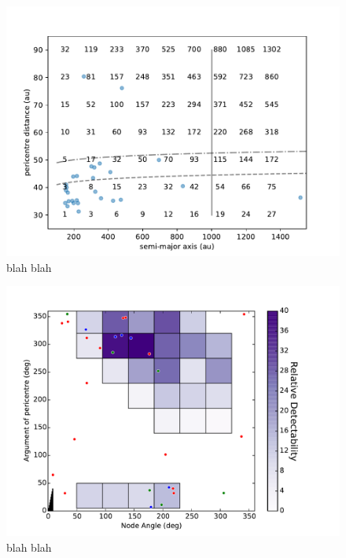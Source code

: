 \documentclass{aastex62}
\begin{document}
\begin{figure}
\begin{center}
\includegraphics[scale=0.8]{figures/figure1.pdf}
\caption{
blah blah
}
\label{fig1}
\end{center}
\end{figure}

\begin{figure}
\begin{center}
\includegraphics[scale=0.8]{figures/figure2.pdf}
\caption{
blah blah
}
\label{fig2}
\end{center}
\end{figure}

\end{document}
